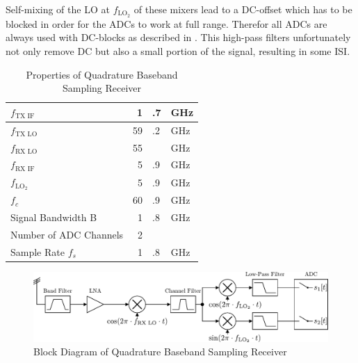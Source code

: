 Self-mixing of the \gls{LO} at $f_{\text{LO}_2}$ of these mixers lead
to a \gls{DC}-offset which has to be blocked in order for the
\glspl{ADC} to work at full range.
Therefor all \glspl{ADC} are always used with \gls{DC}-blocks as described
in . This high-pass filters unfortunately
not only remove \gls{DC} but also a small portion of the signal,
resulting in some \gls{ISI}. \\

\begin{table}[h]
  \centering
  \begin{tabular}{|l|r@{}l@{~}l|}
    \hline
    $f_{\text{TX IF}}$              & 1&.7&GHz \\ \hline
    $f_{\text{TX LO}}$              & 59&.2&GHz \\ \hline
    $f_{\text{RX LO}}$              & 55&&GHz \\ \hline
    $f_{\text{RX IF}}$              & 5&.9&GHz \\ \hline
    $f_{\text{LO}_2}$               & 5&.9&GHz \\ \hline
    $f_c$                         & 60&.9&GHz \\ \hline
    Signal Bandwidth B            & 1&.8&GHz \\ \hline
    Number of \gls{ADC} Channels  & 2 && \\ \hline
    Sample Rate $f_s$ & 1&.8&GHz \\ \hline
  \end{tabular}
  \caption{Properties of Quadrature Baseband Sampling Receiver}
  \label{tab:rx_0}
\end{table}

\begin{figure}[p]
  \centering
  \includegraphics[width=\textwidth]{figures/rx_0_bd}
  \caption{Block Diagram of Quadrature Baseband Sampling Receiver}
  \label{fig:rx_0_bd}
\end{figure}

